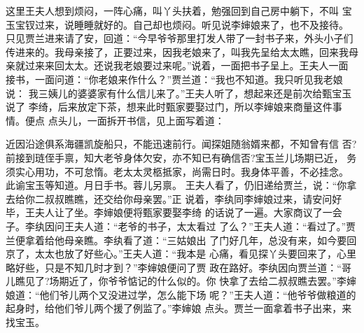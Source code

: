 这里王夫人想到烦闷，一阵心痛，叫丫头扶着，勉强回到自己房中躺下，不叫
宝玉宝钗过来，说睡睡就好的。自己却也烦闷。听见说李婶娘来了，也不及接待。
只见贾兰进来请了安，回道：“今早爷爷那里打发人带了一封书子来，外头小子们
传进来的。我母亲接了，正要过来，因我老娘来了，叫我先呈给太太瞧，回来我母
亲就过来来回太太。还说我老娘要过来呢。”说着，一面把书子呈上。王夫人一面
接书，一面问道：“你老娘来作什么？”贾兰道：“我也不知道。我只听见我老娘说：
我三姨儿的婆婆家有什么信儿来了。”王夫人听了，想起来还是前次给甄宝玉说了
李绮，后来放定下茶，想来此时甄家要娶过门，所以李婶娘来商量这件事情。便点
点头儿，一面拆开书信，见上面写着道：

近因沿途俱系海疆凯旋船只，不能迅速前行。闻探姐随翁婿来都，不知曾有信
否?前接到琏侄手禀，知大老爷身体欠安，亦不知已有确信否?宝玉兰儿场期已近，
务须实心用功，不可怠惰。老太太灵柩抵家，尚需日时。我身体平善，不必挂念。
此谕宝玉等知道。月日手书。蓉儿另禀。
王夫人看了，仍旧递给贾兰，说：“你拿去给你二叔叔瞧瞧，还交给你母亲罢。”正
说着，李纨同李婶娘过来，请安问好毕，王夫人让了坐。李婶娘便将甄家要娶李绮
的话说了一遍。大家商议了一会子。李纨因问王夫人道：“老爷的书子，太太看过
了么？”王夫人道：“看过了。”贾兰便拿着给他母亲瞧。李纨看了道：“三姑娘出
了门好几年，总没有来，如今要回京了，太太也放了好些心。”王夫人道：“我本是
心痛，看见探丫头要回来了，心里略好些，只是不知几时才到？”李婶娘便问了贾
政在路好。李纨因向贾兰道：“哥儿瞧见了?场期近了，你爷爷惦记的什么似的。你
快拿了去给二叔叔瞧去罢。”李婶娘道：“他们爷儿两个又没进过学，怎么能下场
呢？”王夫人道：“他爷爷做粮道的起身时，给他们爷儿两个援了例监了。”李婶娘
点头。贾兰一面拿着书子出来，来找宝玉。


